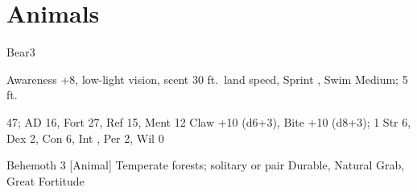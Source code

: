 \section{Animals}

    \begin{monsection}[Black]{Bear}{3}
        \begin{spellcontent}
            \begin{spelltargetinginfo}
                \pari {} Awareness +8, low-light vision, scent
                \pari {} 30 ft.\ land speed, Sprint , Swim 
                \pari {} Medium;  5 ft.
            \end{spelltargetinginfo}
            \begin{spelleffects}
                \pari {} 47;  AD 16, Fort 27, Ref 15, Ment 12
                \pari {} Claw +10 (d6+3), Bite +10 (d8+3);  1
                \pari {} Str 6, Dex 2, Con 6, Int , Per 2, Wil 0
            \end{spelleffects}
        \end{spellcontent}
        \begin{spellfooter}
            \pari {} Behemoth 3 [Animal]
            \pari {} Temperate forests; solitary or pair
            \pari {} Durable, Natural Grab, Great Fortitude
        \end{spellfooter}
    \end{monsection}
